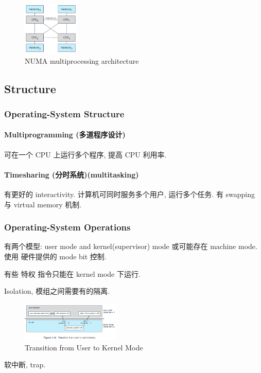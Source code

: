 \begin{figure}[!htb]
    \centering
    \includegraphics[width=0.24\textwidth]{pic/OS1/NUMA multiprocessing architecture}
    \caption{NUMA multiprocessing architecture}
\end{figure}



\subsection{Structure}
\subsubsection{Operating-System Structure}
\paragraph{Multiprogramming (多道程序设计)} 可在一个 CPU 上运行多个程序, 提高 CPU 利用率. 

\paragraph{Timesharing (分时系统)(multitasking)} 有更好的 interactivity. 计算机可同时服务多个用户, 运行多个任务. 有 swapping 与 virtual memory 机制. 



\subsubsection{Operating-System Operations}
有两个模型: user mode and kernel(supervisor) mode 或可能存在 machine mode. 使用 硬件提供的 mode bit 控制. 

有些 特权 指令只能在 kernel mode 下运行. 

Isolation, 模组之间需要有的隔离. 

\begin{figure}[!htb]
    \centering
    \includegraphics[width=0.42\textwidth]{pic/OS1/Transition from User to Kernel Mode.png}
    \caption{Transition from User to Kernel Mode}
\end{figure}
软中断, trap. 

